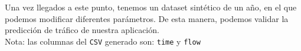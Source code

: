 \documentclass[a4paper, oneside, 12pt]{book}
\begin{document}
\begin{enumerate}
		\noindent Una vez llegados a este punto, tenemos un dataset sintético de un año, en el que podemos modificar diferentes parámetros. De esta manera, podemos validar la predicción de tráfico de nuestra aplicación. \\
		
		\noindent Nota: las columnas del \texttt{CSV} generado son: \texttt{time} y \texttt{flow}
		
	\end{enumerate}
	
\end{document}
